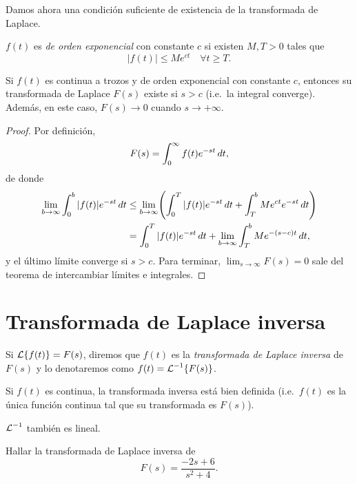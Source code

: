 \documentclass[../ecuaciones_diferenciales.tex]{subfiles}
\begin{document}
Damos ahora una condición suficiente de existencia de la transformada de Laplace.

\begin{definition}
	\(f(t)\) es \emph{de orden exponencial} con constante \(c\) si existen \(M, T
	> 0\) tales que
	\[|f(t)| \leq Me^{ct} \quad \forall t \geq T.\]
\end{definition}

\begin{theorem}
	Si \(f(t)\) es continua a trozos y de orden exponencial con constante \(c\),
	entonces su transformada de Laplace \(F(s)\) existe si \(s > c\) (i.e.\ la
	integral converge). Además, en este caso, \(F(s) \to 0\) cuando \(s \to +\infty\).
	\begin{proof}
		Por definición,
		\[F(s) = \int_0^\infty f(t)e^{-st} \mathop{d\!} t,\]
		de donde
		\begin{align*}
			\lim_{b \to \infty} \int_0^b |f(t)|e^{-st} \dif t
			 & \leq \lim_{b \to \infty} \left( \int_0^T |f(t)|e^{-st} \dif t
			+ \int_T^b Me^{ct}e^{-st} \dif t \right)                         \\
			 & = \int_0^T |f(t)|e^{-st} \dif t + \lim_{b \to \infty}
			\int_T^b Me^{-(s-c)t} \dif t,
		\end{align*}
		y el último límite converge si \(s>c\). Para terminar,
		\(\lim_{s \to \infty} F(s) = 0\) sale del teorema de intercambiar
		límites e integrales.
	\end{proof}
\end{theorem}

\section{Transformada de Laplace inversa}
Si \(\operatorname{\mathcal{L}}\{f(t)\} = F(s)\), diremos que \(f(t)\) es la \emph{transformada de
	Laplace inversa} de \(F(s)\) y lo denotaremos como \(f(t) = \operatorname{\mathcal{L}}^{-1}\{F(s)\}\).

\begin{remark}
	Si \(f(t)\) es continua, la transformada inversa está bien definida
	(i.e.\ \(f(t)\) es la única función continua tal que su transformada es \(F(s)\)).
\end{remark}

\begin{remark}
	\(\operatorname{\mathcal{L}}^{-1}\) también es lineal.
\end{remark}

\begin{example}
	Hallar la transformada de Laplace inversa de
	\[F(s) = \frac{-2s+6}{s^2+4}.\]
\end{example}
\end{document}

